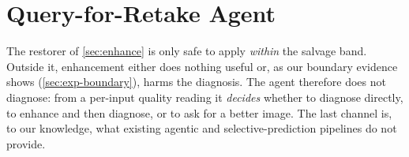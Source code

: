 
\section{Query-for-Retake Agent}\label{sec:agent}

The restorer of \cref{sec:enhance} is only safe to apply \emph{within} the salvage band. Outside
it, enhancement either does nothing useful or, as our boundary evidence shows
(\cref{sec:exp-boundary}), harms the diagnosis. The agent therefore does not diagnose: from a
per-input quality reading it \emph{decides} whether to diagnose directly, to enhance and then
diagnose, or to ask for a better image. The last channel is, to our knowledge, what existing
agentic and selective-prediction pipelines do not provide.

